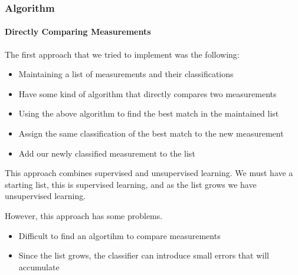\documentclass{beamer}
\begin{document}
\begin{frame}[shrink]
\frametitle{Algorithm}
\framesubtitle{Directly Comparing Measurements}

The first approach that we tried to implement was the following:

\begin{itemize}
\pause
\item{Maintaining a list of measurements and their classifications}
\pause
\item{Have some kind of algorithm that directly compares two measurements}
\pause
\item{Using the above algorithm to find the best match in the maintained list}
\pause
\item{Assign the same classification of the best match to the new measurement}
\pause
\item{Add our newly classified measurement to the list}
\end{itemize}

\pause
This approach combines supervised and unsupervised learning. We must have a starting list, this is supervised learning, and as the list grows we have unsupervised learning.

\pause
\vspace{10pt}

However, this approach has some problems.

\begin{itemize}
\pause
\item{Difficult to find an algortihm to compare measurements}
\pause
\item{Since the list grows, the classifier can introduce small errors that will accumulate}
\end{itemize}

\end{frame}
\end{document}
